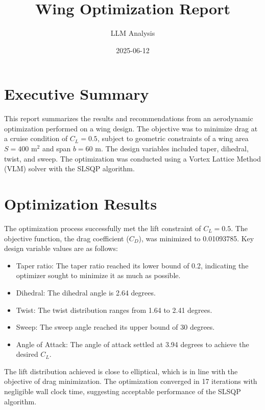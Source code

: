 \documentclass{article}
\title{Wing Optimization Report}
\author{LLM Analysis}
\date{2025-06-12}
\begin{document}
\maketitle

\section*{Executive Summary}
This report summarizes the results and recommendations from an aerodynamic optimization performed on a wing design. The objective was to minimize drag at a cruise condition of $C_L = 0.5$, subject to geometric constraints of a wing area $S = 400 \text{ m}^2$ and span $b = 60 \text{ m}$. The design variables included taper, dihedral, twist, and sweep. The optimization was conducted using a Vortex Lattice Method (VLM) solver with the SLSQP algorithm.

\section{Optimization Results}

The optimization process successfully met the lift constraint of $C_L = 0.5$. The objective function, the drag coefficient ($C_D$), was minimized to 0.01093785. Key design variable values are as follows:

\begin{itemize}
    \item Taper ratio: The taper ratio reached its lower bound of 0.2, indicating the optimizer sought to minimize it as much as possible.
    \item Dihedral: The dihedral angle is 2.64 degrees.
    \item Twist: The twist distribution ranges from 1.64 to 2.41 degrees.
    \item Sweep: The sweep angle reached its upper bound of 30 degrees.
    \item Angle of Attack: The angle of attack settled at 3.94 degrees to achieve the desired $C_L$.
\end{itemize}

The lift distribution achieved is close to elliptical, which is in line with the objective of drag minimization. The optimization converged in 17 iterations with negligible wall clock time, suggesting acceptable performance of the SLSQP algorithm.
\end{document}
